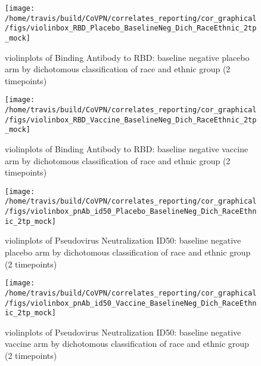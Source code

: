 \documentclass[]{book}
\theoremstyle{definition}
\theoremstyle{definition}
\theoremstyle{definition}
\newcommand{\1}{\mathbbm{1}}
\begin{document}
\clearpage
\begin{figure}[H]

{\centering \texttt{[image: /home/travis/build/CoVPN/correlates\_reporting/cor\_graphical/figs/violinbox\_RBD\_Placebo\_BaselineNeg\_Dich\_RaceEthnic\_2tp\_mock]} 

}

\caption{violinplots of Binding Antibody to RBD: baseline negative placebo arm by dichotomous classification of race and ethnic group (2 timepoints)}\label{fig:unnamed-chunk-229}
\end{figure}

\clearpage
\begin{figure}[H]

{\centering \texttt{[image: /home/travis/build/CoVPN/correlates\_reporting/cor\_graphical/figs/violinbox\_RBD\_Vaccine\_BaselineNeg\_Dich\_RaceEthnic\_2tp\_mock]} 

}

\caption{violinplots of Binding Antibody to RBD: baseline negative vaccine arm by dichotomous classification of race and ethnic group (2 timepoints)}\label{fig:unnamed-chunk-230}
\end{figure}

\clearpage
\begin{figure}[H]

{\centering \texttt{[image: /home/travis/build/CoVPN/correlates\_reporting/cor\_graphical/figs/violinbox\_pnAb\_id50\_Placebo\_BaselineNeg\_Dich\_RaceEthnic\_2tp\_mock]} 

}

\caption{violinplots of Pseudovirus Neutralization ID50: baseline negative placebo arm by dichotomous classification of race and ethnic group (2 timepoints)}\label{fig:unnamed-chunk-231}
\end{figure}

\clearpage
\begin{figure}[H]

{\centering \texttt{[image: /home/travis/build/CoVPN/correlates\_reporting/cor\_graphical/figs/violinbox\_pnAb\_id50\_Vaccine\_BaselineNeg\_Dich\_RaceEthnic\_2tp\_mock]} 

}

\caption{violinplots of Pseudovirus Neutralization ID50: baseline negative vaccine arm by dichotomous classification of race and ethnic group (2 timepoints)}\label{fig:unnamed-chunk-232}
\end{figure}
\end{document}
